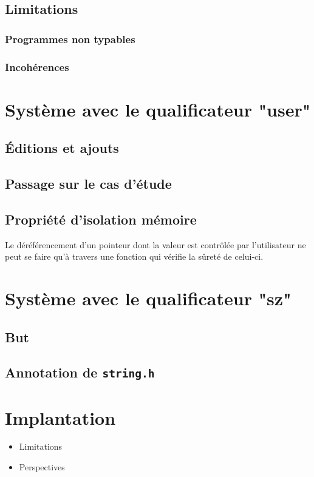 \documentclass{phdthesis}
\begin{document}
\section{Limitations}
\subsection{Programmes non typables}
\subsection{Incohérences}

\chapter{Système avec le qualificateur "user"}

\section{Éditions et ajouts}
\section{Passage sur le cas d'étude}

\section{Propriété d'isolation mémoire}

Le déréférencement d'un pointeur dont la valeur est contrôlée par l'utilisateur
ne peut se faire qu'à travers une fonction qui vérifie la sûreté de celui-ci.

\chapter{Système avec le qualificateur "sz"}

\section{But}
\section{Annotation de \texttt{string.h}}

\chapter{Implantation}


\begin{itemize}
  \item Limitations
  \item Perspectives
\end{itemize}




\end{document}
